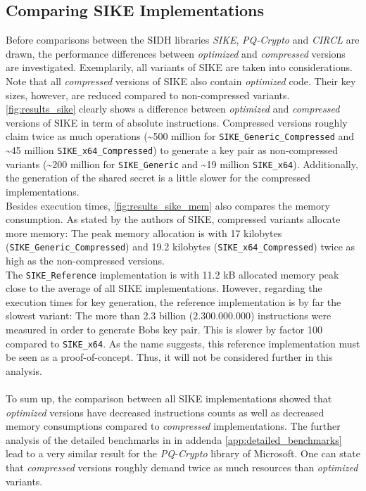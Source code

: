 \subsection{Comparing SIKE Implementations}\label{sec:analysis_sike}
Before comparisons between the SIDH libraries \textit{SIKE}, \textit{PQ-Crypto} and \textit{CIRCL} are drawn, the performance differences between \textit{optimized} and \textit{compressed} versions are investigated. Exemplarily, all variants of SIKE are taken into considerations. Note that all \textit{compressed} versions of SIKE also contain \textit{optimized} code. Their key sizes, however, are reduced compared to non-compressed variants.
\\
\autoref{fig:results_sike} clearly shows a difference between \textit{optimized} and \textit{compressed} versions of SIKE in term of absolute instructions. Compressed versions roughly claim twice as much operations (\textasciitilde 500 million for \texttt{SIKE\_Generic\_Compressed} and \textasciitilde 45 million \texttt{SIKE\_x64\_Compressed}) to generate a key pair as non-compressed variants (\textasciitilde 200 million for \texttt{SIKE\_Generic} and \textasciitilde 19 million \texttt{SIKE\_x64}). Additionally, the generation of the shared secret is a little slower for the compressed implementations.\\
Besides execution times, \autoref{fig:results_sike_mem} also compares the memory consumption. As stated by the authors of SIKE, compressed variants allocate more memory: The peak memory allocation is with 17 kilobytes (\texttt{SIKE\_Generic\_Compressed}) and 19.2 kilobytes (\texttt{SIKE\_x64\_Compressed}) twice as high as the non-compressed versions.\\
The \texttt{SIKE\_Reference} implementation is with 11.2 kB allocated memory peak close to the average of all SIKE implementations. However, regarding the execution times for key generation, the reference implementation is by far the slowest variant: The more than 2.3 billion ($2.300.000.000$) instructions were measured in order to generate Bobs key pair. This is slower by factor 100 compared to \texttt{SIKE\_x64}. As the name suggests, this reference implementation must be seen as a proof-of-concept. Thus, it will not be considered further in this analysis.
\\\\
To sum up, the comparison between all SIKE implementations showed that \textit{optimized} versions have decreased instructions counts as well as decreased memory consumptions compared to \textit{compressed} implementations. The further analysis of the detailed benchmarks in in addenda \ref{app:detailed_benchmarks} lead to a very similar result for the \textit{PQ-Crypto} library of Microsoft.
One can state that \textit{compressed} versions roughly demand twice as much resources than \textit{optimized} variants.

